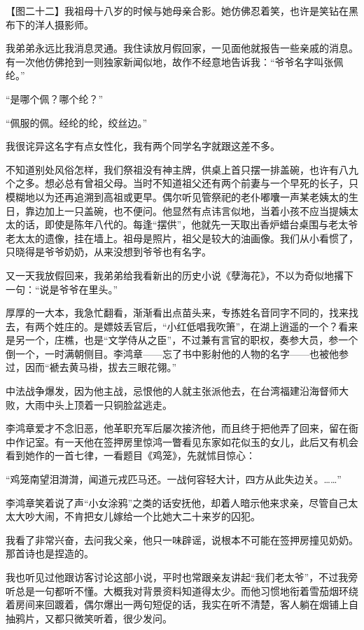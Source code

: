 \clearpage
\par 【图二十二】我祖母十八岁的时候与她母亲合影。她仿佛忍着笑，也许是笑钻在黑布下的洋人摄影师。
\par 我弟弟永远比我消息灵通。我住读放月假回家，一见面他就报告一些亲戚的消息。有一次他仿佛抢到一则独家新闻似地，故作不经意地告诉我：“爷爷名字叫张佩纶。”
\par “是哪个佩？哪个纶？”
\par “佩服的佩。经纶的纶，绞丝边。”
\par 我很诧异这名字有点女性化，我有两个同学名字就跟这差不多。
\par 不知道别处风俗怎样，我们祭祖没有神主牌，供桌上首只摆一排盖碗，也许有八九个之多。想必总有曾祖父母。当时不知道祖父还有两个前妻与一个早死的长子，只模糊地以为还再追溯到高祖或更早。偶尔听见管祭祀的老仆嘟囔一声某老姨太的生日，靠边加上一只盖碗，也不便问。他显然有点讳言似地，当着小孩不应当提姨太太的话，即使是陈年八代的。每逢“摆供”，他就先一天取出香炉蜡台桌围与老太爷老太太的遗像，挂在墙上。祖母是照片，祖父是较大的油画像。我们从小看惯了，只晓得是爷爷奶奶，从来没想到爷爷也有名字。
\par 又一天我放假回来，我弟弟给我看新出的历史小说《孽海花》，不以为奇似地撂下一句：“说是爷爷在里头。”
\par 厚厚的一大本，我急忙翻看，渐渐看出点苗头来，专拣姓名音同字不同的，找来找去，有两个姓庄的。是嫖妓丢官后，“小红低唱我吹箫”，在湖上逍遥的一个？看来是另一个，庄樵，也是“文学侍从之臣”，不过兼有言官的职权，奏参大员，参一个倒一个，一时满朝侧目。李鸿章——忘了书中影射他的人物的名字——也被他参过，因而“褫去黄马褂，拔去三眼花翎。”
\par 中法战争爆发，因为他主战，忌恨他的人就主张派他去，在台湾福建沿海督师大败，大雨中头上顶着一只铜脸盆逃走。
\par 李鸿章爱才不念旧恶，他革职充军后屡次接济他，而且终于把他弄了回来，留在衙中作记室。有一天他在签押房里惊鸿一瞥看见东家如花似玉的女儿，此后又有机会看到她作的一首七律，一看题目《鸡笼》，先就怵目惊心：
\par “鸡笼南望泪潸潸，闻道元戎匹马还。一战何容轻大计，四方从此失边关。……”
\par 李鸿章笑着说了声“小女涂鸦”之类的话安抚他，却着人暗示他来求亲，尽管自己太太大吵大闹，不肯把女儿嫁给一个比她大二十来岁的囚犯。
\par 我看了非常兴奋，去问我父亲，他只一味辟谣，说根本不可能在签押房撞见奶奶。那首诗也是捏造的。
\par 我也听见过他跟访客讨论这部小说，平时也常跟亲友讲起“我们老太爷”，不过我旁听总是一句都听不懂。大概我对背景资料知道得太少。而他习惯地衔着雪茄烟环绕着房间来回踱着，偶尔爆出一两句短促的话，我实在听不清楚，客人躺在烟铺上自抽鸦片，又都只微笑听着，很少发问。
